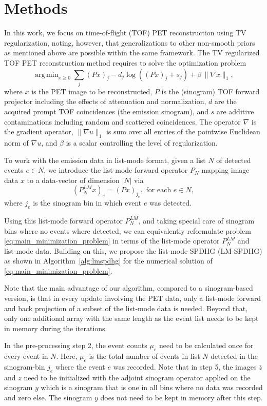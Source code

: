 \documentclass{IEEEtran}
\DeclareMathOperator*{\argmin}{arg\,min}
\begin{document}
\section{Methods}

In this work, we focus on time-of-flight (TOF) PET reconstruction using TV regularization, 
noting, however, that generalizations to other non-smooth priors as mentioned above are possible 
within the same framework. 
The TV regularized TOF PET reconstruction method requires to solve the optimization problem
%
\begin{equation} \label{eq:main_minimization_problem}
\argmin _{x\geq 0} \sum_j (Px)_j -  d_j \log \left( (Px)_ j + s_j \right) + \beta \, \|\nabla x\|_{1},
\end{equation}
%
where $x$ is the PET image to be reconstructed, $P$ is the (sinogram) TOF forward projector including 
the effects of attenuation and normalization, $d$ are the acquired prompt TOF coincidences 
(the emission sinogram), and $s$ are additive contaminations including random and scattered coincidences.
The operator $\nabla$ is the gradient operator, $\|\nabla u \|_1$ is sum over all entries of the 
pointwise Euclidean norm of $\nabla u$, and $\beta$ is a scalar controlling the level of regularization.

To work with the emission data in list-mode format, given a list $N$ of detected events $e \in N$, we introduce the list-mode forward operator $P_N$ mapping image data $x$ to a data-vector of dimension $|N|$ via
\[ (P^{LM}_N x)_e  = (Px)_{j_e} , \text{ for each }e \in N,\]
where $j_e$ is the sinogram bin in which event $e$ was detected.

Using this list-mode forward operator $P^{LM}_N$, and taking special care of sinogram bins where no events where detected, we can equivalently reformulate problem \eqref{eq:main_minimization_problem} in terms of the list-mode operator $P^{LM}_N$ and list-mode data. Building on this, we propose the list-mode SPDHG (LM-SPDHG) as shown in Algorithm~\ref{alg:lmspdhg} for the numerical solution of \eqref{eq:main_minimization_problem}.

Note that the main advantage of our algorithm, compared to a sinogram-based version, is that in every update involving the PET data, only a list-mode forward and back projection of
a subset of the list-mode data is needed. Beyond that, only one additional array with the same length
as the event list needs to be kept in memory during the iterations. 

In the pre-processing step 2, the event counts $\mu_e$ need to be calculated once for every event in $N$. Here, $\mu_{e}$ is the total number of events in list $N$ detected in the sinogram-bin $j_e$ where the event $e$ was recorded.
Note that in step 5, the images $\bar{z}$ and $z$ need to be initialized with the adjoint sinogram
operator applied on the sinogram $y$ which is a sinogram that is one in all bins where no data was
recorded and zero else. The sinogram $y$ does not need to be kept in memory after this step.
\end{document}
